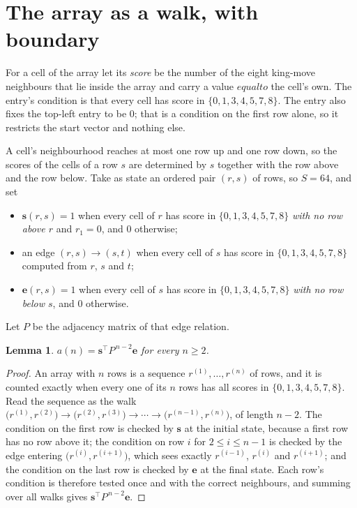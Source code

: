 \documentclass[11pt,a4paper]{article}
\theoremstyle{plain}
\newtheorem{lemma}[theorem]{Lemma}
\theoremstyle{definition}
\begin{document}
\section{The array as a walk, with boundary}

For a cell of the array let its \emph{score} be the number of the eight king-move neighbours that lie inside
the array and carry a value $equal to$ the cell's own. The entry's condition is that every cell
has score in $\{0,1,3,4,5,7,8\}$. The entry also fixes the top-left entry to be $0$; that is a condition on the first row alone, so it restricts the start vector and nothing else.

A cell's neighbourhood reaches at most one row up and one row down, so the scores of the
cells of a row $s$ are determined by $s$ together with the row above and the row below.
Take as state an ordered pair $(r,s)$ of rows, so $S=64$, and set
\begin{itemize}
\item $\mathbf{s}(r,s)=1$ when every cell of $r$ has score in $\{0,1,3,4,5,7,8\}$ \emph{with no row
above $r$} and $r_1=0$, and $0$ otherwise;
\item an edge $(r,s)\to(s,t)$ when every cell of $s$ has score in $\{0,1,3,4,5,7,8\}$ computed from
$r$, $s$ and $t$;
\item $\mathbf{e}(r,s)=1$ when every cell of $s$ has score in $\{0,1,3,4,5,7,8\}$ \emph{with no row
below $s$}, and $0$ otherwise.
\end{itemize}
Let $P$ be the adjacency matrix of that edge relation.

\begin{lemma}\label{lem:walk}
$a(n)=\mathbf{s}^{\!\top}P^{\,n-2}\mathbf{e}$ for every $n\ge2$.
\end{lemma}

\begin{proof}
An array with $n$ rows is a sequence $r^{(1)},\dots,r^{(n)}$ of rows, and it is counted
exactly when every one of its $n$ rows has all scores in $\{0,1,3,4,5,7,8\}$. Read the sequence as the
walk $\bigl(r^{(1)},r^{(2)}\bigr)\to\bigl(r^{(2)},r^{(3)}\bigr)\to\cdots\to
\bigl(r^{(n-1)},r^{(n)}\bigr)$, of length $n-2$. The condition on the first row is
checked by $\mathbf{s}$ at the initial state, because a first row has no row above it; the
condition on row $i$ for $2\le i\le n-1$ is checked by the edge entering
$\bigl(r^{(i)},r^{(i+1)}\bigr)$, which sees exactly $r^{(i-1)}$, $r^{(i)}$ and
$r^{(i+1)}$; and the condition on the last row is checked by $\mathbf{e}$ at the final
state. Each row's condition is therefore tested once and with the correct neighbours, and
summing over all walks gives $\mathbf{s}^{\!\top}P^{\,n-2}\mathbf{e}$.
\end{proof}
\end{document}
